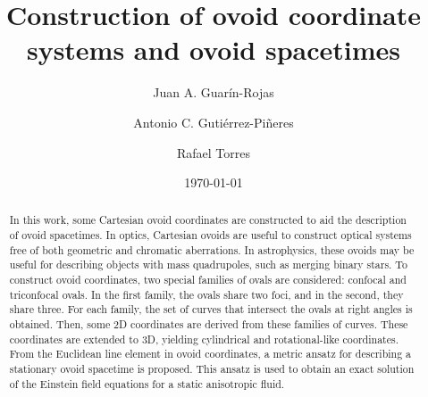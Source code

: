 \documentclass[12pt, ams, nofootinbib]{revtex4}
\theoremstyle{definition}
\begin{document}

\title{Construction of ovoid coordinate systems and ovoid spacetimes}

\author{Juan A. Guarín-Rojas}

\author{Antonio C. Guti\'errez-Pi\~{n}eres}

\author{Rafael Torres}

\date{\today}


\begin{abstract} 
In this work, some Cartesian ovoid coordinates are constructed to aid the description of ovoid spacetimes. In optics, Cartesian ovoids are useful to construct optical systems free of both geometric and chromatic aberrations. In astrophysics, these ovoids may be useful for describing objects with mass quadrupoles, such as merging binary stars. To construct ovoid coordinates, two special families of ovals are considered: confocal and triconfocal ovals. In the first family, the ovals share two foci, and in the second, they share three. For each family, the set of curves that intersect the ovals at right angles is obtained. Then, some 2D coordinates are derived from these families of curves. These coordinates are extended to 3D, yielding cylindrical and rotational-like coordinates. From the Euclidean line element in ovoid coordinates, a metric ansatz for describing a stationary ovoid spacetime is proposed. This ansatz is used to obtain an exact solution of the Einstein field equations for a static anisotropic fluid.
\end{abstract}
\end{document}
